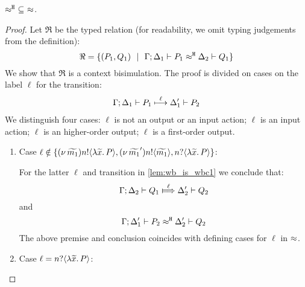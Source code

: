 
\begin{lemma}
	\label{app:lem:wb_is_wbc}
	$\approx^\mathtt{H}\ \subseteq\ \approx$.
\end{lemma}

\begin{proof}
	Let $\Re$ be the typed relation (for readability, we omit typing judgements from the definition):
	\[
		\Re = \{(P_1, Q_1) \ \ |\ \  \Gamma; \Delta_1 \vdash P_1 \approx^\mathtt{H} \Delta_2 \vdash Q_1\}
	\]
	We show that $\Re$ is a context bisimulation.
	The proof is divided on cases on the label $\ell$ for the transition:
%
	\begin{eqnarray}
		\Gamma; \Delta_1 \vdash P_1 \stackrel{\ell}{\longmapsto} \Delta_1' \vdash P_2
		\label{lem:wb_is_wbc1}
	\end{eqnarray}
%
We distinguish four cases: $\ell$ is not an output or an input action; $\ell$ is an input action;
$\ell$ is an higher-order output; $\ell$ is a first-order output.
	\begin{enumerate}
		\item
				Case $\ell \notin \{ (\nu\, \widetilde{m_1}) n ! \langle \lambda \widetilde{x}.\,P \rangle,  (\nu\, \widetilde{m_1}') n ! \langle \widetilde{m_1} \rangle, n ? \langle \lambda \widetilde{x}.\,P \rangle \}$:

				\noi For the latter $\ell$ and transition in \eqref{lem:wb_is_wbc1} we conclude that:	
				\[
					\horel{\Gamma}{\Delta_2}{Q_1}{\Hby{\ell}}{\Delta_2'}{Q_2}
				\]
				\noi and
				\[
					\Gamma; \Delta_1' \vdash P_2 \approx^\mathtt{H} \Delta_2' \vdash Q_2
				\]
				The above premise and conclusion coincides with defining cases for $\ell$ in $\approx$.

		\item	Case $\ell = n ? \langle \lambda \widetilde{x}.\,P \rangle$:


\end{enumerate}
\end{proof}
